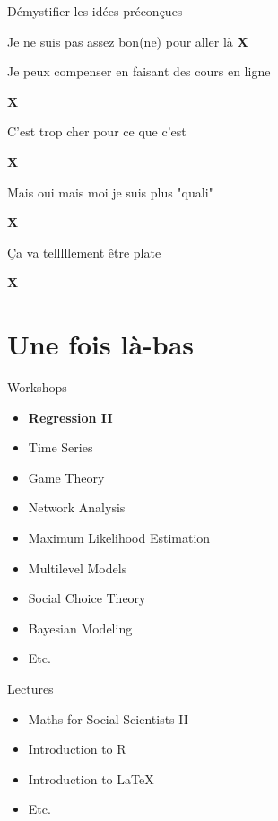 \documentclass{beamer}
\begin{document}
\begin{frame}{Démystifier les idées préconçues}
\begin{itemize}
    \item Je ne suis pas assez bon(ne) pour aller là \Large{\textbf{\color{red}X}}
    \normalsize{\item Je peux compenser en faisant des cours en ligne} \Large{\textbf{\color{red}X}}
    \normalsize{\item C'est trop cher pour ce que c'est} \Large{\textbf{\color{red}X}}
    \normalsize{\item Mais oui mais moi je suis plus "quali"} \Large{\textbf{\color{red}X}}
     \normalsize{\item Ça va telllllement être plate} \Large{\textbf{\color{red}X}}
\end{itemize}
\end{frame}



\section{Une fois là-bas}

\begin{frame}{Workshops}
  \begin{itemize}
    \item \textbf{Regression II}
    \item Time Series
    \item Game Theory 
    \item Network Analysis
    \item Maximum Likelihood Estimation
    \item Multilevel Models 
    \item Social Choice Theory
    \item Bayesian Modeling 
    \item Etc. 
  \end{itemize}
\end{frame}

\begin{frame}{Lectures}
\begin{itemize}
    \item Maths for Social Scientists II
    \item Introduction to R 
    \item Introduction to LaTeX 
    \item Etc. 
  \end{itemize}
\end{frame}
\end{document}
